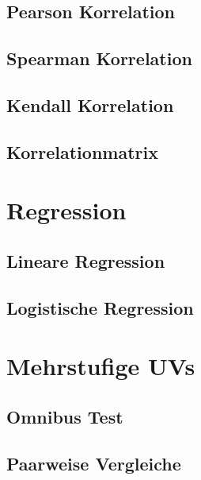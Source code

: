 \documentclass[
]{book}
\begin{document}
\hypertarget{pearson-korrelation}{%
\section{Pearson Korrelation}\label{pearson-korrelation}}

\hypertarget{spearman-korrelation}{%
\section{Spearman Korrelation}\label{spearman-korrelation}}

\hypertarget{kendall-korrelation}{%
\section{Kendall Korrelation}\label{kendall-korrelation}}

\hypertarget{korrelationmatrix}{%
\section{Korrelationmatrix}\label{korrelationmatrix}}

\hypertarget{regression}{%
\chapter{Regression}\label{regression}}

\hypertarget{lineare-regression}{%
\section{Lineare Regression}\label{lineare-regression}}

\hypertarget{logistische-regression}{%
\section{Logistische Regression}\label{logistische-regression}}

\hypertarget{mehrstufige-uvs}{%
\chapter{Mehrstufige UVs}\label{mehrstufige-uvs}}

\hypertarget{omnibus-test}{%
\section{Omnibus Test}\label{omnibus-test}}

\hypertarget{paarweise-vergleiche}{%
\section{Paarweise Vergleiche}\label{paarweise-vergleiche}}
\end{document}
